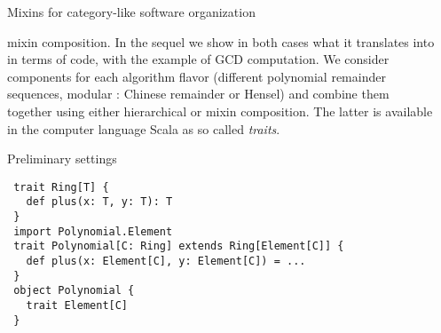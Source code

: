 \documentclass[final]{beamer}
\begin{document}
\begin{frame}[fragile]
\begin{columns}[t]
\begin{column}{.3\linewidth}
\begin{block}{\large Mixins for category-like software organization}
{mixin composition. In the sequel we show in both cases what it translates
into in terms of code, with the example of GCD computation. We consider
components for each algorithm flavor (different polynomial remainder
sequences, modular : Chinese remainder or Hensel) and combine them
together using either hierarchical or mixin composition. The latter
is available in the computer language Scala as so called {\em traits}.
\par}\par
  \end{block}
\hfill
  \begin{block}{\large Preliminary settings}
\tiny %
\begin{lstlisting}
 trait Ring[T] {
   def plus(x: T, y: T): T
 }
 import Polynomial.Element
 trait Polynomial[C: Ring] extends Ring[Element[C]] {
   def plus(x: Element[C], y: Element[C]) = ...
 }
 object Polynomial {
   trait Element[C]
 }
\end{lstlisting}
  \end{block}
\end{column}


\begin{column}{.3\linewidth}


\end{column}
\end{columns}
\end{frame}
\end{document}
